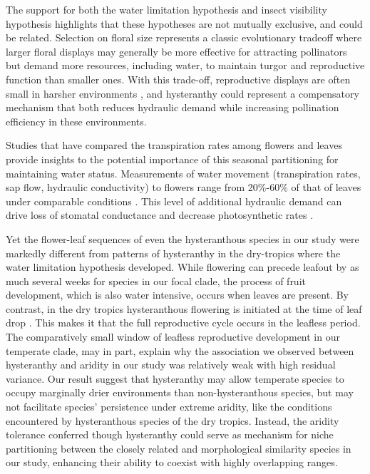 \documentclass{article}[11pt]
\begin{document}
{The support for both the water limitation hypothesis and insect visibility hypothesis highlights that these hypotheses are not mutually exclusive, and could be related. Selection on floral size represents a classic evolutionary tradeoff where larger floral displays may generally be more effective for attracting pollinators but demand more resources, including water, to maintain turgor and reproductive function than smaller ones\citep{Galen:1999vr,Lambrecht:2007ur}. With this trade-off, reproductive displays are often small in harsher environments \citep{}, and hysteranthy could represent a compensatory mechanism that both reduces hydraulic demand while increasing pollination efficiency in these environments.

Studies that have compared the transpiration rates among flowers and leaves provide insights to the potential importance of this seasonal partitioning for maintaining water status. Measurements of water movement (transpiration rates, sap flow, hydraulic conductivity) to flowers range from 20\%-60\% of that of leaves under comparable conditions \citep{Whiley:1988uf,Roddy:2012wn,Liu:2017wg,McMann:2022ww}. This level of additional hydraulic demand can drive loss of stomatal conductance and decrease photosynthetic rates \citep{Galen:1999vr}.
 
Yet the flower-leaf sequences of even the hysteranthous species in our study were markedly different from patterns of hysteranthy in the dry-tropics where the water limitation hypothesis developed. While flowering can precede leafout by as much several weeks for species in our focal clade, the process of fruit development, which is also water intensive, occurs when leaves are present. By contrast, in the dry tropics hysteranthous flowering is initiated at the time of leaf drop \citep{Borchert1983,Franklin2016}. This makes it that the full reproductive cycle occurs in the leafless period. The comparatively small window of leafless reproductive development in our temperate clade, may in part, explain why the association we observed between hysteranthy and aridity in our study was relatively weak with high residual variance. Our result suggest that hysteranthy may allow temperate species to occupy marginally drier environments than non-hysteranthous species, but may not facilitate species' persistence under extreme aridity, like the conditions encountered by hysteranthous species of the dry tropics. Instead, the aridity tolerance conferred though hysteranthy could serve as mechanism for niche partitioning between the closely related and morphological similarity species in our study, enhancing their ability to coexist with highly overlapping ranges.

}
\end{document}
